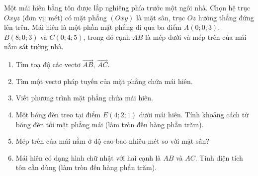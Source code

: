 \begin{bai}Một mái hiên bằng tôn được lắp nghiêng phía trước một ngôi nhà. Chọn hệ trục $Oxyz$ (đơn vị: mét) có mặt phẳng $(Oxy)$ là mặt sân, trục $Oz$ hướng thẳng đứng lên trên. Mái hiên là một phần mặt phẳng đi qua ba điểm $A(0;0;3)$, $B(8;0;3)$ và $C(0;4;5)$, trong đó cạnh $AB$ là mép dưới và mép trên của mái nằm sát tường nhà.
\begin{enumerate}[label=\alph*)]
\item Tìm toạ độ các vectơ $\overrightarrow{AB}$, $\overrightarrow{AC}$.
\item Tìm một vectơ pháp tuyến của mặt phẳng chứa mái hiên.
\item Viết phương trình mặt phẳng chứa mái hiên.
\item Một bóng đèn treo tại điểm $E(4;2;1)$ dưới mái hiên. Tính khoảng cách từ bóng đèn tới mặt phẳng mái (làm tròn đến hàng phần trăm).
\item Mép trên của mái nằm ở độ cao bao nhiêu mét so với mặt sân?
\item Mái hiên có dạng hình chữ nhật với hai cạnh là $AB$ và $AC$. Tính diện tích tôn cần dùng (làm tròn đến hàng phần trăm).
\end{enumerate}
\end{bai}

